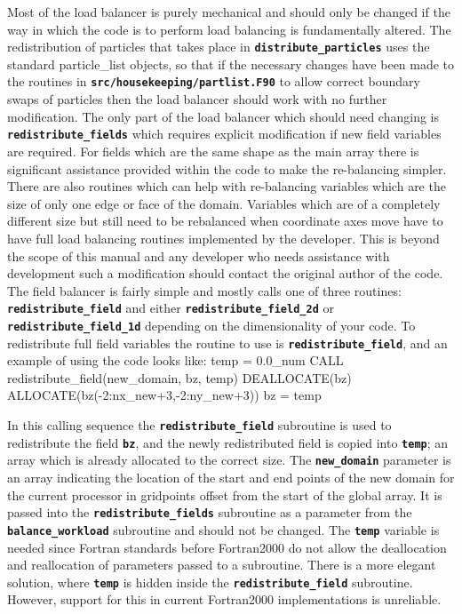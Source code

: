 \documentclass[12pt,a4paper]{article}
\newcommand{\inlinecode}[1]{{\color{warwickred} \bf\texttt{#1}}}
\newenvironment{boxverbatim}{\lboxverbatim{none}}{\endlboxverbatim}
\begin{document}
Most of the load balancer is purely mechanical and should only be changed if
the way in which the code is to perform load balancing is fundamentally
altered. The redistribution of particles that takes place in
\inlinecode{distribute\_particles} uses the standard particle\_list objects, so
that if the necessary changes have been made to the routines in
\inlinecode{src/housekeeping/partlist.F90} to allow correct
boundary swaps of particles then the load balancer should work with no further
modification. The only part of the load balancer which should need changing is
\inlinecode{redistribute\_fields} which requires explicit modification if new
field variables are required. For fields which are the same shape as the main
array there is significant assistance provided within the code to make the
re-balancing simpler. There are also routines which can help with re-balancing
variables which are the size of only one edge or face of the domain. Variables
which are of a completely different size but still need to be rebalanced when
coordinate axes move have to have full load balancing routines implemented by
the developer. This is beyond the scope of this manual and any developer who
needs assistance with development such a modification should contact the
original author of the code. The field balancer is fairly simple and mostly
calls one of three routines: \inlinecode{redistribute\_field} and either
\inlinecode{redistribute\_field\_2d} or \inlinecode{redistribute\_field\_1d}
depending on the dimensionality of your code. To redistribute full field
variables the routine to use is \inlinecode{redistribute\_field}, and an
example of using the code looks like:
\begin{boxverbatim}
  temp = 0.0_num
  CALL redistribute_field(new_domain, bz, temp)
  DEALLOCATE(bz)
  ALLOCATE(bz(-2:nx_new+3,-2:ny_new+3))
  bz = temp
\end{boxverbatim}

In this calling sequence the
\inlinecode{redistribute\_field} subroutine is used to redistribute the field
\inlinecode{bz}, and the newly redistributed field is copied
into \inlinecode{temp}; an array which is already allocated to the
correct size. The \inlinecode{new\_domain} parameter is an array indicating the
location of the start and end points of the new domain for the current processor
in gridpoints offset from the start of the global array. It is passed into the
\inlinecode{redistribute\_fields} subroutine as a parameter from the
\inlinecode{balance\_workload} subroutine and should not be changed. The
\inlinecode{temp} variable is needed since Fortran standards before Fortran2000
do not allow the deallocation and reallocation of parameters passed to a
subroutine. There is a more elegant solution, where \inlinecode{temp} is
hidden inside the \inlinecode{redistribute\_field} subroutine. However, support
for this in current Fortran2000 implementations is unreliable.\\
\end{document}
